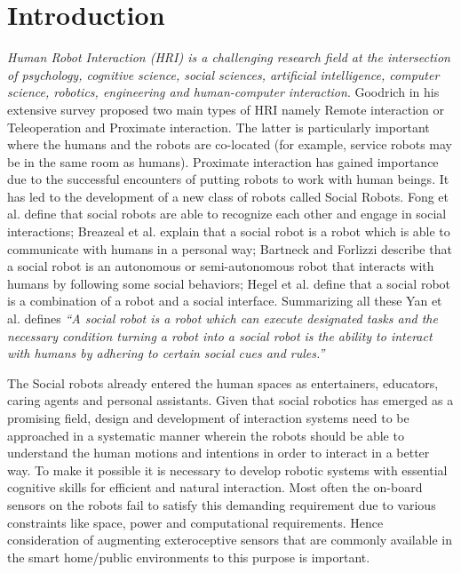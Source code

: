 \documentclass{llncs}
\begin{document}
\section{Introduction}
%
\emph{Human Robot Interaction (HRI) is a challenging research field at the intersection of psychology, cognitive science, social sciences, artificial intelligence, computer science, robotics, engineering and human-computer interaction}\cite{Dautenhahn2007}. Goodrich\cite{Goodrich:2007:HIS:1348099.1348100} in his extensive survey proposed two main types of HRI namely Remote interaction or Teleoperation and Proximate interaction. The latter is particularly important where the humans and the robots are co-located (for example, service robots may be in the same room as humans). Proximate interaction has gained importance due to the successful encounters of putting robots to work with human beings. It has led to the development of a new class of robots called Social Robots. Fong et al. \cite{Fong2003} define that social robots are able to recognize each other and engage in social interactions; Breazeal et al.\cite{Breazeal:2002:DSR:515422} explain that a social robot is a robot which is able to communicate with humans in a personal way; Bartneck and Forlizzi \cite{Bartneck2004} describe that a social robot is an autonomous or semi-autonomous robot that interacts with humans by following some social behaviors; Hegel et al. \cite{Hegel2009} define that a social robot is a combination of a robot and a social interface. Summarizing all these Yan et al. \cite{Yan2014} defines \emph{“A social robot is a robot which can execute designated tasks and the necessary condition turning a robot into a social robot is the ability to interact with humans by adhering to certain social cues and rules.”}

The Social robots already entered the human spaces as entertainers\cite{NaoTheRobot}, educators\cite{NaoTheRobot}, caring agents\cite{ASKNao} and personal assistants\cite{ProjectRomeo}. Given that social robotics has emerged as a promising field, design and development of interaction systems need to be approached in a systematic manner wherein the robots should be able to understand the human motions and intentions in order to interact in a better way. To make it possible it is necessary to develop robotic systems with essential cognitive skills for efficient and natural interaction. Most often the on-board sensors on the robots fail to satisfy this demanding requirement due to various constraints like space, power and computational requirements. Hence consideration of augmenting exteroceptive sensors that are commonly available in the smart home/public environments to this purpose is important.
\end{document}
